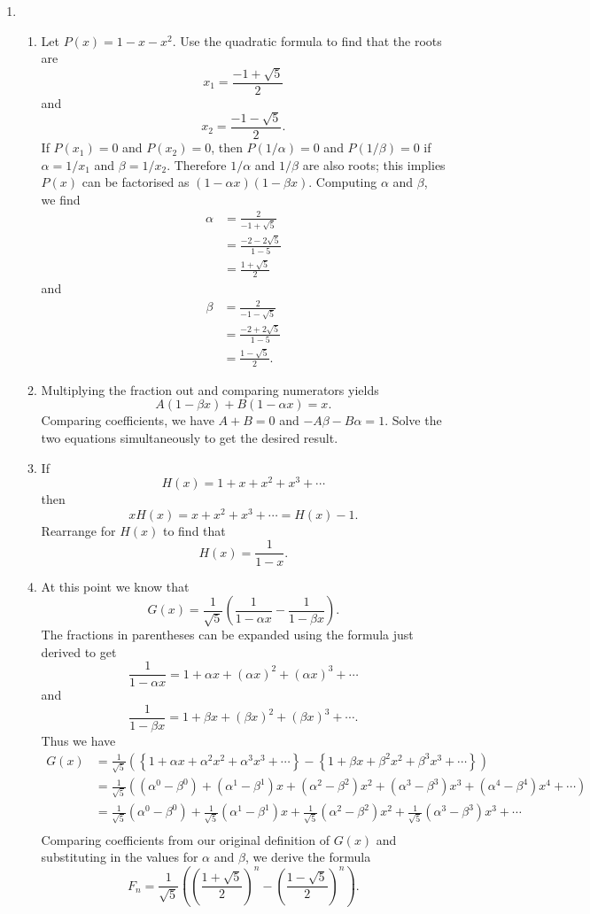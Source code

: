 \documentclass[a4paper]{article}
\begin{document}
\begin{enumerate}
\item
  \begin{enumerate}
\item
  Let \(P(x)=1-x-x^2\). Use the quadratic formula to find that the roots are \[x_1=\frac{-1+\sqrt{5}}{2}\] and \[x_2=\frac{-1-\sqrt{5}}{2}.\]
  If \(P(x_1)=0\) and \(P(x_2)=0\), then \(P(1/\alpha)=0\) and \(P(1/\beta)=0\) if \(\alpha=1/x_1\) and \(\beta=1/x_2\). Therefore \(1/\alpha\) and \(1/\beta\)
  are also roots; this implies \(P(x)\) can be factorised as \((1-\alpha x)(1-\beta x)\). Computing \(\alpha\) and \(\beta\), we find
  \[\begin{split}
      \alpha&=\frac{2}{-1+\sqrt{5}}\\&=\frac{-2-2\sqrt{5}}{1-5}\\&=\frac{1+\sqrt{5}}{2}
      \end{split}
    \]
    and
    \[
      \begin{split}
        \beta&=\frac{2}{-1-\sqrt{5}}\\&=\frac{-2+2\sqrt{5}}{1-5}\\&=\frac{1-\sqrt{5}}{2}.
      \end{split}
    \]
  \item Multiplying the fraction out and comparing numerators yields \[A(1-\beta x)+B(1-\alpha x)=x.\]
    Comparing coefficients, we have \(A+B=0\) and \(-A\beta -B\alpha=1.\) Solve the two equations simultaneously to get the desired result.
  \item If \[H(x)=1+x+x^2+x^3+\cdots\] then \[xH(x)=x+x^2+x^3+\cdots=H(x)-1.\]
    Rearrange for \(H(x)\) to find that \[H(x)=\frac{1}{1-x}.\]
  \item At this point we know that
    \[G(x)=\frac{1}{\sqrt{5}}\left(\frac{1}{1-\alpha x}-\frac{1}{1-\beta x}\right).\]
    The fractions in parentheses can be expanded using the formula just derived to get
    \[\frac{1}{1-\alpha x}=1+\alpha x+(\alpha x)^2+(\alpha x)^3+\cdots\]
    and \[\frac{1}{1-\beta x}=1+\beta x+(\beta x)^2 +(\beta x)^3+\cdots.\]
    Thus we have
    \[
      \begin{split}
        G(x)&=\frac{1}{\sqrt5}\left(\left\{1+\alpha x+\alpha^2x^2+\alpha^3x^3+\cdots\right\}-\left\{1+\beta x+\beta^2x^2+\beta^3x^3+\cdots\right\}\right)\\
            &=\frac{1}{\sqrt5}\left((\alpha^0-\beta^0)+(\alpha^1-\beta^1)x+(\alpha^2-\beta^2)x^2+(\alpha^3-\beta^3)x^3+(\alpha^4-\beta^4)x^4+\cdots\right)\\
        &=\frac{1}{\sqrt5}(\alpha^0-\beta^0)+\frac{1}{\sqrt5}(\alpha^1-\beta^1)x+\frac{1}{\sqrt5}(\alpha^2-\beta^2)x^2+\frac{1}{\sqrt5}(\alpha^3-\beta^3)x^3+\cdots\\
      \end{split}
    \]
    Comparing coefficients from our original definition of \(G(x)\) and substituting in the values for \(\alpha\) and \(\beta\), we derive the formula
    \[F_n=\frac{1}{\sqrt5}\left(\left(\frac{1+\sqrt5}{2}\right)^n-\left(\frac{1-\sqrt5}{2}\right)^n\right).\]
\end{enumerate}
  \end{enumerate}
\end{document}
